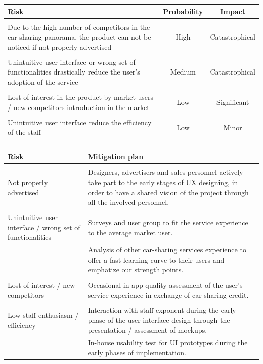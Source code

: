 \documentclass[english]{article}
\begin{document}
	\begin{table}[H]
		\centering
		\begin{tabular}{ p{7cm} c c }
		\textbf{Risk} & \textbf{Probability} & \textbf{Impact} \\ \hline \\
		Due to the high number of competitors in the car sharing panorama, the product can not be noticed if not properly advertised & High & Catastrophical \\ \\
		Unintuitive user interface or wrong set of functionalities drastically reduce the user's adoption of the service & Medium & Catastrophical \\ \\
		Lost of interest in the product by market users / new competitors introduction in the market & Low & Significant \\ \\
		
		Unintuitive user interface reduce the efficiency of the staff & Low & Minor \\ \\
		\end{tabular}
	\end{table}
	
	\begin{table}[H]
		\centering
		\begin{tabular}{ p{6cm} p{6cm} }
		\textbf{Risk} & \textbf{Mitigation plan} \\ \hline \\
		Not properly advertised & Designers, advertisers and sales personnel actively take part to the early stages of UX designing, in order to have a shared vision of the project through all the involved personnel. \\ \\
		Unintuitive user interface / wrong set of functionalities & Surveys and user group to fit the service experience to the average market user. \\ 
		& Analysis of other car-sharing services experience to offer a fast learning curve to their users and emphatize our strength points. \\ \\
		 Lost of interest / new competitors & Occasional in-app quality assessment of the user's service experience in exchange of car sharing credit. \\ \\
		 Low staff enthusiasm / efficiency & Interaction with staff exponent during the early phase of the user interface design through the presentation / assessment of mockups. \\ 
		 & In-house usability test for UI prototypes during the early phases of implementation. \\
		\end{tabular}
	\end{table}
	
\end{document}

